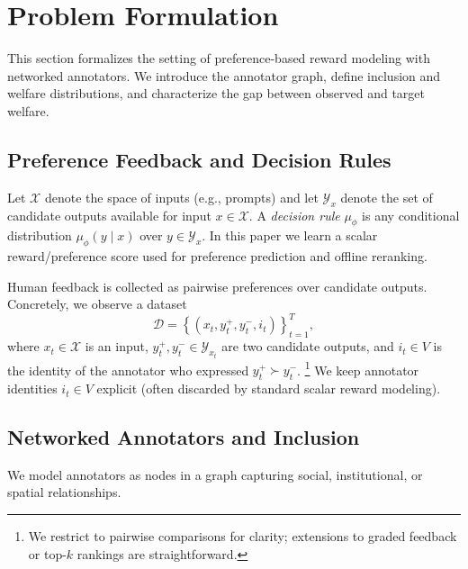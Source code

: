 \documentclass{article}
\theoremstyle{plain}
\theoremstyle{definition}
\theoremstyle{remark}
\begin{document}

\section{Problem Formulation}
\label{sec:problem}

This section formalizes the setting of preference-based reward modeling with networked annotators. We introduce the annotator graph, define inclusion and welfare distributions, and characterize the gap between observed and target welfare.

\subsection{Preference Feedback and Decision Rules}
\label{subsec:feedback}

Let $\mathcal{X}$ denote the space of inputs (e.g., prompts) and let
$\mathcal{Y}_x$ denote the set of candidate outputs available for input
$x\in\mathcal{X}$.
A \emph{decision rule} $\mu_\phi$ is any conditional distribution $\mu_\phi(y\mid x)$ over $y\in\mathcal{Y}_x$.
In this paper we learn a scalar reward/preference score used for preference prediction and offline reranking.

Human feedback is collected as pairwise preferences over candidate outputs.
Concretely, we observe a dataset
\begin{equation}
    \mathcal{D}
    =
    \left\{ (x_t, y_t^+, y_t^-, i_t) \right\}_{t=1}^T,
\end{equation}
where $x_t\in\mathcal{X}$ is an input, $y_t^+,y_t^-\in\mathcal{Y}_{x_t}$ are two
candidate outputs, and $i_t\in V$ is the identity of the annotator who
expressed $y_t^+\succ y_t^-$.%
\footnote{We restrict to pairwise comparisons for clarity; extensions to
graded feedback or top-$k$ rankings are straightforward.} We keep annotator identities $i_t\in V$ explicit (often discarded by standard scalar reward modeling).

\subsection{Networked Annotators and Inclusion}
\label{subsec:networked-annotators}

We model annotators as nodes in a graph capturing social, institutional, or
spatial relationships.
\end{document}
